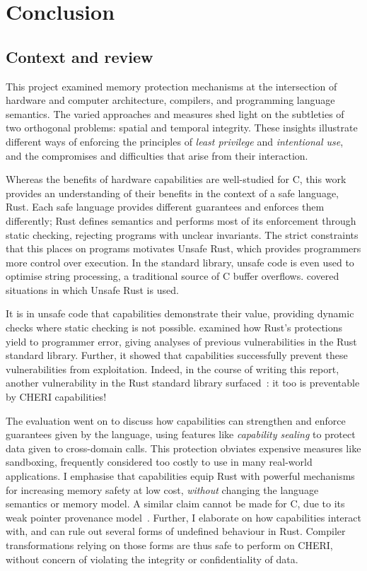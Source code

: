 \documentclass[dissertation.tex]{subfiles}
\begin{document}
\chapter{Conclusion}
\label{ch:con}

\section{Context and review}

This project examined memory protection mechanisms at
the intersection of hardware and computer architecture, compilers, and
programming language semantics.
The varied approaches and measures shed light on the subtleties of
two orthogonal problems: spatial and temporal integrity.
These insights illustrate different ways of enforcing the principles of
\emph{least privilege} and \emph{intentional use}, and the compromises
and difficulties that arise from their interaction.

Whereas the benefits of hardware capabilities are well-studied for C,
this work provides an understanding of their benefits in the context of
a safe language, Rust.
Each safe language provides different guarantees and enforces them
differently; Rust defines semantics and performs most of its enforcement
through static checking, rejecting programs with unclear invariants.
The strict constraints that this places on programs motivates Unsafe
Rust, which provides programmers more control over execution.
In the standard library, unsafe code is even used to optimise string
processing, a traditional source of C buffer overflows.
 covered situations in which
Unsafe Rust is used.

It is in unsafe code that capabilities demonstrate their value,
providing dynamic checks where static checking is not possible.
 examined how Rust's protections yield to
programmer error, giving analyses of previous vulnerabilities in the
Rust standard library.
Further, it showed that capabilities successfully prevent these
vulnerabilities from exploitation.
Indeed, in the course of writing this report, another vulnerability in
the Rust standard library surfaced~\cite{rust-advisory-cast}: it too
is preventable by CHERI capabilities!

The evaluation went on to discuss how capabilities can strengthen and
enforce guarantees given by the language, using features like
\emph{capability sealing} to protect data given to cross-domain calls.
This protection obviates expensive measures like sandboxing, frequently
considered too costly to use in many real-world applications.
I emphasise that capabilities equip Rust with powerful
mechanisms for increasing memory safety at low cost,
\emph{without} changing the language semantics or memory model.
A similar claim cannot be made for C, due to its weak pointer
provenance model~\cite{cheri-2019-abstract}.
Further, I elaborate on how capabilities interact with, and can rule out
several forms of undefined behaviour in Rust.
Compiler transformations relying on those forms are thus safe to
perform on CHERI, without concern of violating the integrity or
confidentiality of data.
\end{document}
